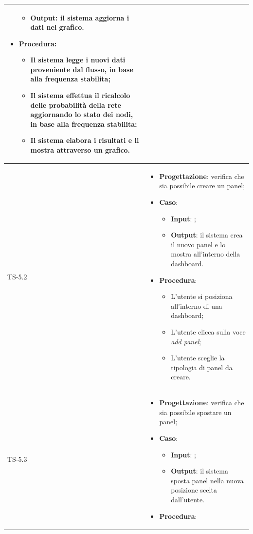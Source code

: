 \begin{longtable}{|C{2.5cm}|C{13cm}|}
\begin{itemize}
\begin{itemize}
		\item \textbf{Output}: il sistema aggiorna i dati nel grafico.
	\end{itemize}
	\item \textbf{Procedura}:
	\begin{itemize}
		\item Il sistema legge i nuovi dati proveniente dal flusso, in base alla frequenza stabilita;
		\item Il sistema effettua il ricalcolo delle probabilità della rete aggiornando lo stato dei nodi, in base alla frequenza stabilita;
		\item Il sistema elabora i risultati e li mostra attraverso un grafico.
	\end{itemize} 
\end{itemize}
\\
	\hline
	{TS-5.2} & 
\begin{itemize}
	\item \textbf{Progettazione}: verifica che sia possibile creare un panel;
	\item \textbf{Caso}: 
	\begin{itemize}
		\item \textbf{Input}: ;
		\item \textbf{Output}: il sistema crea il nuovo panel e lo mostra all'interno della dashboard.
	\end{itemize}
	\item \textbf{Procedura}:
	\begin{itemize}
		\item L'utente si posiziona all'interno di una dashboard;
		\item L'utente clicca sulla voce \emph{add panel};
		\item L'utente sceglie la tipologia di panel da creare.
	\end{itemize} 
\end{itemize}
 \\
	\hline
	{TS-5.3} & 
\begin{itemize}
	\item \textbf{Progettazione}: verifica che sia possibile spostare un panel;
	\item \textbf{Caso}: 
	\begin{itemize}
		\item \textbf{Input}: ;
		\item \textbf{Output}: il sistema sposta panel nella nuova posizione scelta dall'utente.
	\end{itemize}
	\item \textbf{Procedura}:

\end{itemize}
\end{longtable}
